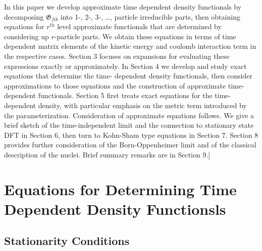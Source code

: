 \documentclass[aps,preprint]{revtex4}%
\begin{document}
In this paper we develop approximate time dependent density functionals by
decomposing $\mathfrak{G}_{fib}$ into 1-, 2-, 3-, \ldots, particle irreducible
parts, then obtaining equations for $r^{\text{th}}$ level approximate
functionals that are determined by considering up $r$-particle parts. We
obtain these equations in terms of time dependent matrix elements of the
kinetic energy and coulomb interaction term in the respective cases. Section 3
focuses on expansions for evaluating these expressions exactly or
approximately. In Section 4 we develop and study exact equations that
determine the time- dependent density functionals, then consider
approximations to those equations and the construction of approximate
time-dependent functionals. Section 5 first treats exact equations for the
time-dependent density, with particular emphasis on the metric term introduced
by the parameterization. Consideration of approximate equations follows. We
give a brief sketch of the time-independent limit and the connection to
stationary state DFT in Section 6, then turn to Kohn-Sham type equations in
Section 7. Section 8 provides further consideration of the Born-Oppenheimer
limit and of the classical description of the nuclei. Brief summary remarks
are in Section 9.]

\section{Equations for Determining Time Dependent Density Functionsls}

\subsection{Stationarity Conditions\bigskip}
\end{document}

